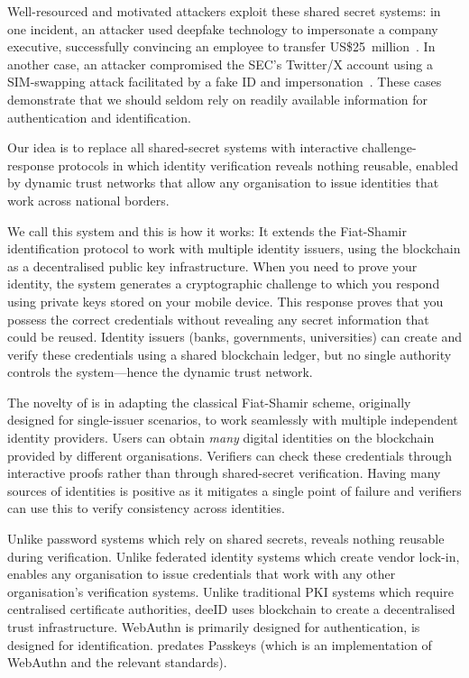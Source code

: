 Well-resourced and motivated attackers exploit these shared secret systems: in one incident, an attacker used deepfake technology to impersonate a company executive, successfully convincing an employee to transfer US\$25~million~\cite{milmo_uk_2024}. In another case, an attacker compromised the SEC's Twitter/X account using a SIM-swapping attack facilitated by a fake ID and impersonation~\cite{kan_hijack_2024}. These cases demonstrate that we should seldom rely on readily available information for authentication and identification.

Our idea is to replace all shared-secret systems with interactive challenge-response protocols in which identity verification reveals nothing reusable, enabled by dynamic trust networks that allow any organisation to issue identities that work across national borders.

We call this system \deeid and this is how it works: It extends the Fiat-Shamir identification protocol to work with multiple identity issuers, using the blockchain as a decentralised public key infrastructure. When you need to prove your identity, the system generates a cryptographic challenge to which you respond using private keys stored on your mobile device. This response proves that you possess the correct credentials without revealing any secret information that could be reused. Identity issuers (banks, governments, universities) can create and verify these credentials using a shared blockchain ledger, but no single authority controls the system---hence the dynamic trust network.

The novelty of \deeid is in adapting the classical Fiat-Shamir scheme, originally designed for single-issuer scenarios, to work seamlessly with multiple independent identity providers. Users can obtain \textit{many} digital identities on the blockchain provided by different organisations. Verifiers can check these credentials through interactive proofs rather than through shared-secret verification. Having many sources of identities is positive as it mitigates a single point of failure and verifiers can use this to verify consistency across identities.

Unlike password systems which rely on shared secrets, \deeid reveals nothing reusable during verification. Unlike federated identity systems which create vendor lock-in, \deeid enables any organisation to issue credentials that work with any other organisation's verification systems. Unlike traditional PKI systems which require centralised certificate authorities, deeID uses blockchain to create a decentralised trust infrastructure. WebAuthn is primarily designed for authentication, \deeid is designed for identification. \deeid predates Passkeys (which is an implementation of WebAuthn and the relevant standards).

